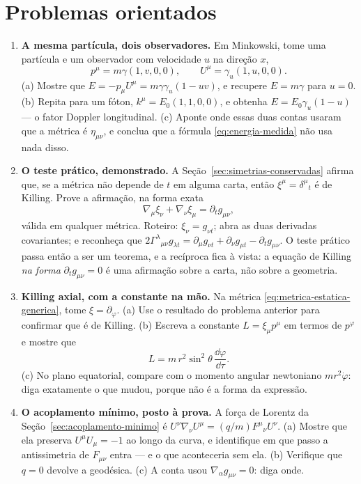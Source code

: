 \documentclass[12pt,a4paper,oneside]{book}
\theoremstyle{rgplain}
\theoremstyle{rgremark}
\begin{document}
\section{Problemas orientados}

\begin{enumerate}
  \item \textbf{A mesma partícula, dois observadores.} Em Minkowski, tome uma
  partícula e um observador com velocidade $u$ na direção $x$,
  \[
    p^\mu=m\gamma(1,v,0,0) ,
    \qquad
    U^\mu=\gamma_u(1,u,0,0) .
  \]
  (a) Mostre que $E=-p_\mu U^\mu=m\gamma\gamma_u(1-uv)$, e recupere
  $E=m\gamma$ para $u=0$. (b) Repita para um fóton, $k^\mu=E_0(1,1,0,0)$, e
  obtenha $E=E_0\gamma_u(1-u)$ --- o fator Doppler longitudinal. (c) Aponte
  onde essas duas contas usaram que a métrica é $\eta_{\mu\nu}$, e conclua que
  a fórmula \eqref{eq:energia-medida} não usa nada disso.

  \item \textbf{O teste prático, demonstrado.} A
  Seção~\ref{sec:simetrias-conservadas} afirma que, se a métrica não depende de
  $t$ em alguma carta, então $\xi^\mu=\delta^\mu{}_t$ é de Killing. Prove a
  afirmação, na forma exata
  \[
    \nabla_\mu\xi_\nu+\nabla_\nu\xi_\mu=\partial_t g_{\mu\nu} ,
  \]
  válida em qualquer métrica. Roteiro: $\xi_\nu=g_{\nu t}$; abra as duas
  derivadas covariantes; e reconheça que
  $2\Gamma^\lambda{}_{\mu\nu}g_{\lambda t}
  =\partial_\mu g_{\nu t}+\partial_\nu g_{\mu t}-\partial_t g_{\mu\nu}$.
  O teste prático passa então a ser um teorema, e a recíproca fica à vista: a
  equação de Killing \emph{na forma} $\partial_t g_{\mu\nu}=0$ é uma afirmação
  sobre a carta, não sobre a geometria.

  \item \textbf{Killing axial, com a constante na mão.} Na métrica
  \eqref{eq:metrica-estatica-generica}, tome $\xi=\partial_\varphi$. (a) Use o
  resultado do problema anterior para confirmar que é de Killing. (b) Escreva a
  constante $L=\xi_\mu p^\mu$ em termos de $p^\varphi$ e mostre que
  \[
    L=m\,r^2\sin^2\theta\,\frac{\dd\varphi}{\dd\tau} .
  \]
  (c) No plano equatorial, compare com o momento angular newtoniano
  $mr^2\dot\varphi$: diga exatamente o que mudou, porque não é a forma da
  expressão.

  \item \textbf{O acoplamento mínimo, posto à prova.} A força de
  Lorentz da Seção~\ref{sec:acoplamento-minimo} é
  $U^\nu\nabla_\nu U^\mu=(q/m)F^\mu{}_\nu U^\nu$. (a) Mostre que ela preserva
  $U^\mu U_\mu=-1$ ao longo da curva, e identifique em que passo a antissimetria
  de $F_{\mu\nu}$ entra --- e o que aconteceria sem ela. (b) Verifique que
  $q=0$ devolve a geodésica. (c) A conta usou $\nabla_\alpha g_{\mu\nu}=0$:
  diga onde.


\end{enumerate}
\end{document}
